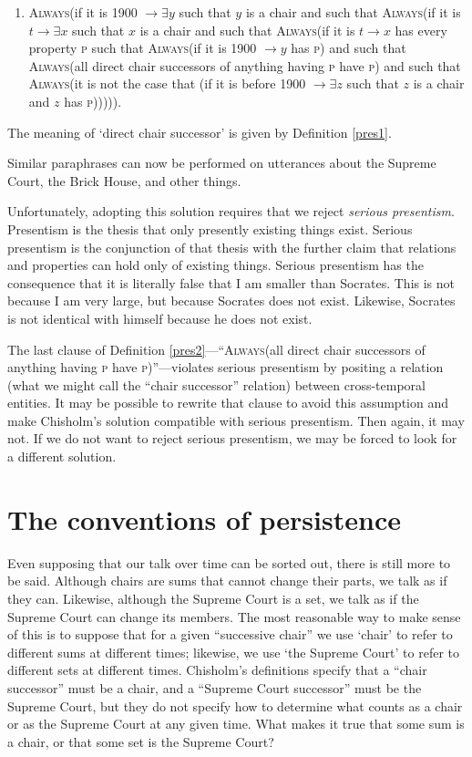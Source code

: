 \documentclass[11pt]{article}
\begin{document}
\begin{spacing}{1.5}
\begin{enumerate}[label=2a.]
  \item \textsc{Always}(if it is 1900 $\rightarrow \exists y$ such
    that $y$ is a chair and such that \textsc{Always}(if it is $t
    \rightarrow \exists x$ such that $x$ is a chair and such that
    \textsc{Always}(if it is $t \rightarrow x$ has every property
    \textsc{p} such that \textsc{Always}(if it is 1900 $\rightarrow y$
    has \textsc{p}) and such that \textsc{Always}(all direct chair
    successors of anything having \textsc{p} have \textsc{p}) and such
    that \textsc{Always}(it is not the case that (if it is before 1900
    $\rightarrow \exists z$ such that $z$ is a chair and $z$ has
    \textsc{p}))))).
\end{enumerate}
The meaning of `direct chair successor' is given by Definition
\ref{pres1}.

Similar paraphrases can now be performed on utterances about the
Supreme Court, the Brick House, and other things.

Unfortunately, adopting this solution requires that we reject {\em
  serious presentism}.  Presentism is the thesis that only presently
existing things exist.  Serious presentism is the conjunction of that
thesis with the further claim that relations and properties can hold
only of existing things.  Serious presentism has the consequence that
it is literally false that I am smaller than Socrates.  This is not
because I am very large, but because Socrates does not exist.
Likewise, Socrates is not identical with himself because he does not
exist.

The last clause of Definition \ref{pres2}---``\textsc{Always}(all
direct chair successors of anything having \textsc{p} have
\textsc{p})''---violates serious presentism by positing a relation
(what we might call the ``chair successor'' relation) between
cross-temporal entities.  It may be possible to rewrite that clause to
avoid this assumption and make Chisholm's solution compatible with
serious presentism.  Then again, it may not.  If we do not want to
reject serious presentism, we may be forced to look for a different
solution.

\section{The conventions of persistence}
\label{set-convention}
Even supposing that our talk over time can be sorted out, there is
still more to be said.  Although chairs are sums that cannot change
their parts, we talk as if they can.  Likewise, although the Supreme
Court is a set, we talk as if the Supreme Court can change its
members.  The most reasonable way to make sense of this is to suppose
that for a given ``successive chair'' we use `chair' to refer to
different sums at different times; likewise, we use `the Supreme
Court' to refer to different sets at different times.  Chisholm's
definitions specify that a ``chair successor'' must be a chair, and a
``Supreme Court successor'' must be the Supreme Court, but they do not
specify how to determine what counts as a chair or as the Supreme
Court at any given time.  What makes it true that some sum is a chair,
or that some set is the Supreme Court?


\end{spacing}
\end{document}
